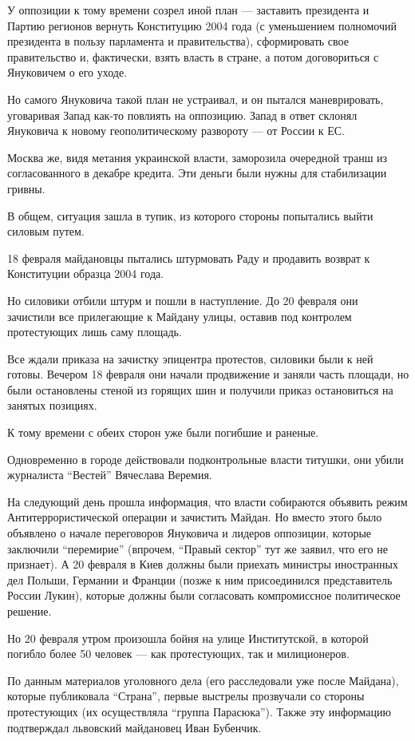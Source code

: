 У оппозиции к тому времени созрел иной план --- заставить президента и
Партию регионов вернуть Конституцию 2004 года (с уменьшением полномочий
президента в пользу парламента и правительства), сформировать свое
правительство и, фактически, взять власть в стране, а потом договориться с
Януковичем о его уходе. 

Но самого Януковича такой план не устраивал, и он пытался маневрировать,
уговаривая Запад как-то повлиять на оппозицию. Запад в ответ склонял
Януковича к новому геополитическому развороту --- от России к ЕС. 

Москва же, видя метания украинской власти, заморозила очередной транш из
согласованного в декабре кредита. Эти деньги были нужны для стабилизации
гривны.

В общем, ситуация зашла в тупик, из которого стороны попытались выйти
силовым путем.

18 февраля майдановцы пытались штурмовать Раду и продавить возврат к
Конституции образца 2004 года.

Но силовики отбили штурм и пошли в наступление. До 20 февраля они
зачистили все прилегающие к Майдану улицы, оставив под контролем
протестующих лишь саму площадь.

Все ждали приказа на зачистку эпицентра протестов, силовики были к ней
готовы. Вечером 18 февраля они начали продвижение и заняли часть площади,
но были остановлены стеной из горящих шин и получили приказ остановиться
на занятых позициях.

К тому времени с обеих сторон уже были погибшие и раненые.

Одновременно в городе действовали подконтрольные власти титушки, они убили
журналиста \enquote{Вестей} Вячеслава Веремия.

На следующий день прошла информация, что власти собираются объявить режим
Антитеррористической операции и зачистить Майдан. Но вместо этого было
объявлено о начале переговоров Януковича и лидеров оппозиции, которые
заключили \enquote{перемирие} (впрочем, \enquote{Правый сектор} тут же заявил, что его не
признает). А 20 февраля в Киев должны были приехать министры иностранных
дел Польши, Германии и Франции (позже к ним присоединился представитель
России Лукин), которые должны были согласовать компромиссное политическое
решение.

Но 20 февраля утром произошла бойня на улице Институтской, в которой
погибло более 50 человек --- как протестующих, так и милиционеров.

По данным материалов уголовного дела (его расследовали уже после Майдана),
которые публиковала \enquote{Страна}, первые выстрелы прозвучали со стороны
протестующих (их осуществляла \enquote{группа Парасюка}). Также эту информацию
подтверждал львовский майдановец Иван Бубенчик. 


